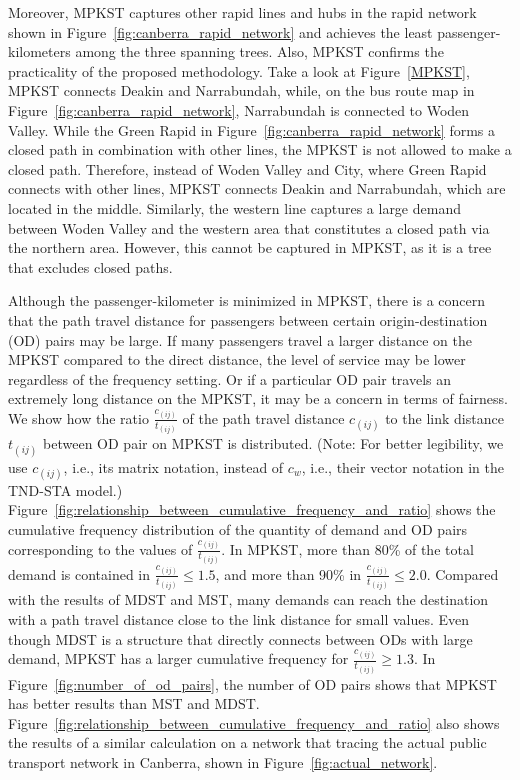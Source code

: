 \documentclass[10pt,english]{article}
\newcommand{\figref}[1]{Figure~\ref{#1}}
\begin{document}
Moreover, MPKST captures other rapid lines and hubs in the rapid network shown in \figref{fig:canberra_rapid_network} and achieves the least passenger-kilometers among the three spanning trees. Also, MPKST confirms the practicality of the proposed methodology. Take a look at \figref{MPKST}, MPKST connects Deakin and Narrabundah, while, on the bus route map in \figref{fig:canberra_rapid_network}, Narrabundah is connected to Woden Valley. While the Green Rapid in \figref{fig:canberra_rapid_network} forms a closed path in combination with other lines, the MPKST is not allowed to make a closed path. Therefore, instead of Woden Valley and City, where Green Rapid connects with other lines, MPKST connects Deakin and Narrabundah, which are located in the middle. Similarly, the western line captures a large demand between Woden Valley and the western area that constitutes a closed path via the northern area. However, this cannot be captured in MPKST, as it is a tree that excludes closed paths.

Although the passenger-kilometer is minimized in MPKST, there is a concern that the path travel distance for passengers between certain origin-destination (OD) pairs may be large. If many passengers travel a larger distance on the MPKST compared to the direct distance, the level of service may be lower regardless of the frequency setting. Or if a particular OD pair travels an extremely long distance on the MPKST, it may be a concern in terms of fairness. We show how the ratio $\frac{c_{\left(ij\right)}}{t_{\left(ij\right)}}$  of the path travel distance $c_{\left(ij\right)}$ to the link distance $t_{\left(ij\right)}$ between OD pair on MPKST is distributed. (Note: For better legibility, we use $c_{\left(ij\right)}$, i.e., its matrix notation, instead of $c_w$, i.e., their vector notation in the TND-STA model.) \figref{fig:relationship_between_cumulative_frequency_and_ratio} shows the cumulative frequency distribution of the quantity of demand and OD pairs corresponding to the values of $\frac{c_{\left(ij\right)}}{t_{\left(ij\right)}}$. In MPKST, more than 80\% of the total demand is contained in $\frac{c_{\left(ij\right)}}{t_{\left(ij\right)}}\leq 1.5$, and more than 90\% in $\frac{c_{\left(ij\right)}}{t_{\left(ij\right)}}\leq 2.0$. Compared with the results of MDST and MST, many demands can reach the destination with a path travel distance close to the link distance for small values. Even though MDST is a structure that directly connects between ODs with large demand, MPKST has a larger cumulative frequency for $\frac{c_{\left(ij\right)}}{t_{\left(ij\right)}}\geq 1.3$. In \figref{fig:number_of_od_pairs}, the number of OD pairs shows that MPKST has better results than MST and MDST. \figref{fig:relationship_between_cumulative_frequency_and_ratio} also shows the results of a similar calculation on a network that tracing the actual public transport network in Canberra, shown in \figref{fig:actual_network}.
\end{document}
